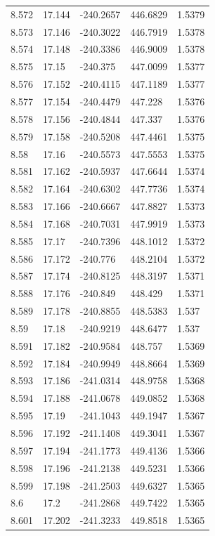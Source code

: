 \begin{tabular}{lllll}
8.572 & 17.144 & -240.2657 & 446.6829 & 1.5379 \\
8.573 & 17.146 & -240.3022 & 446.7919 & 1.5378 \\
8.574 & 17.148 & -240.3386 & 446.9009 & 1.5378 \\
8.575 & 17.15 & -240.375 & 447.0099 & 1.5377 \\
8.576 & 17.152 & -240.4115 & 447.1189 & 1.5377 \\
8.577 & 17.154 & -240.4479 & 447.228 & 1.5376 \\
8.578 & 17.156 & -240.4844 & 447.337 & 1.5376 \\
8.579 & 17.158 & -240.5208 & 447.4461 & 1.5375 \\
8.58 & 17.16 & -240.5573 & 447.5553 & 1.5375 \\
8.581 & 17.162 & -240.5937 & 447.6644 & 1.5374 \\
8.582 & 17.164 & -240.6302 & 447.7736 & 1.5374 \\
8.583 & 17.166 & -240.6667 & 447.8827 & 1.5373 \\
8.584 & 17.168 & -240.7031 & 447.9919 & 1.5373 \\
8.585 & 17.17 & -240.7396 & 448.1012 & 1.5372 \\
8.586 & 17.172 & -240.776 & 448.2104 & 1.5372 \\
8.587 & 17.174 & -240.8125 & 448.3197 & 1.5371 \\
8.588 & 17.176 & -240.849 & 448.429 & 1.5371 \\
8.589 & 17.178 & -240.8855 & 448.5383 & 1.537 \\
8.59 & 17.18 & -240.9219 & 448.6477 & 1.537 \\
8.591 & 17.182 & -240.9584 & 448.757 & 1.5369 \\
8.592 & 17.184 & -240.9949 & 448.8664 & 1.5369 \\
8.593 & 17.186 & -241.0314 & 448.9758 & 1.5368 \\
8.594 & 17.188 & -241.0678 & 449.0852 & 1.5368 \\
8.595 & 17.19 & -241.1043 & 449.1947 & 1.5367 \\
8.596 & 17.192 & -241.1408 & 449.3041 & 1.5367 \\
8.597 & 17.194 & -241.1773 & 449.4136 & 1.5366 \\
8.598 & 17.196 & -241.2138 & 449.5231 & 1.5366 \\
8.599 & 17.198 & -241.2503 & 449.6327 & 1.5365 \\
8.6 & 17.2 & -241.2868 & 449.7422 & 1.5365 \\
8.601 & 17.202 & -241.3233 & 449.8518 & 1.5365 \\

\end{tabular}
